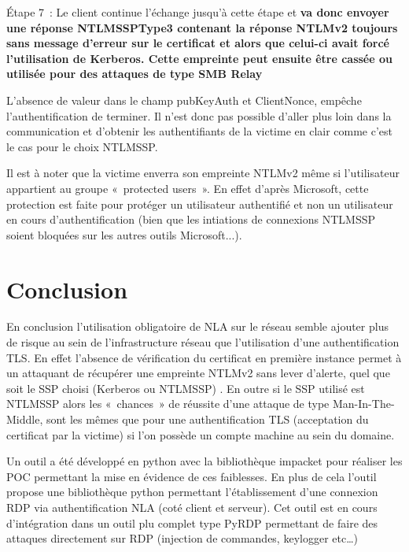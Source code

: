 Étape 7 :
Le client continue l'\'echange jusqu'à cette étape et \textbf{va donc envoyer une réponse NTLMSSPType3 contenant la réponse NTLMv2 toujours sans message d’erreur sur le certificat et alors que celui-ci avait forcé l’utilisation de Kerberos. Cette empreinte peut ensuite être cassée ou utilisée pour des attaques de type SMB Relay}

L’absence de valeur dans le champ pubKeyAuth et ClientNonce, empêche l’authentification de terminer. Il n’est donc pas possible d’aller plus loin dans la communication et d’obtenir les authentifiants de la victime en clair comme c’est le cas pour le choix NTLMSSP.

Il est à noter que la victime enverra son empreinte NTLMv2 même si l’utilisateur appartient au groupe « protected users ». En effet d’après Microsoft, cette protection est faite pour prot\'eger un utilisateur authentifié et non un utilisateur en cours d’authentification (bien que les intiations de connexions NTLMSSP soient bloquées sur les autres outils Microsoft...).

\section{Conclusion}
En conclusion l’utilisation obligatoire de NLA sur le r\'eseau semble ajouter plus de risque au sein de l’infrastructure réseau que l’utilisation d’une authentification TLS.
En effet l’absence de v\'erification du certificat en première instance permet à un attaquant de récupérer une empreinte NTLMv2 sans lever d’alerte, quel que soit le SSP choisi (Kerberos ou NTLMSSP) .
En outre si le SSP utilis\'e est NTLMSSP alors les « chances » de réussite d’une attaque de type Man-In-The-Middle, sont les mêmes que pour une authentification TLS (acceptation du certificat par la victime) si l’on possède un compte machine au sein du domaine.

Un outil a \'eté développé en python avec la bibliothèque impacket pour réaliser les POC permettant la mise en évidence de ces faiblesses.
En plus de cela l’outil propose une bibliothèque python permettant l’\'etablissement d’une connexion RDP via authentification NLA (coté client et serveur). Cet outil est en cours d’intégration dans un outil plu complet type PyRDP permettant de faire des attaques directement sur RDP (injection de commandes, keylogger etc…)
